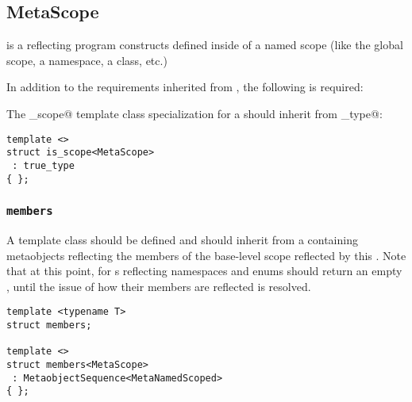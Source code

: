 \subsection{MetaScope}
\label{concept-MetaScope}

 is a  reflecting program constructs defined inside
of a named scope (like the global scope, a namespace, a class, etc.)

In addition to the requirements inherited from , the following is required:

The \verb@is_scope@ template class specialization for a  should
inherit from \verb@true_type@:

\begin{verbatim}
template <>
struct is_scope<MetaScope>
 : true_type
{ };
\end{verbatim}

\subsubsection{\texttt{members}}

A template class \verb@members@ should be defined and should inherit from a
 containing  metaobjects reflecting
the members of the base-level scope reflected by this .
Note that at this point, for s reflecting namespaces and enums
\verb@members@ should return an empty , until the
issue of how their members are reflected is resolved.


\begin{verbatim}
template <typename T>
struct members;

template <>
struct members<MetaScope>
 : MetaobjectSequence<MetaNamedScoped>
{ };
\end{verbatim}

